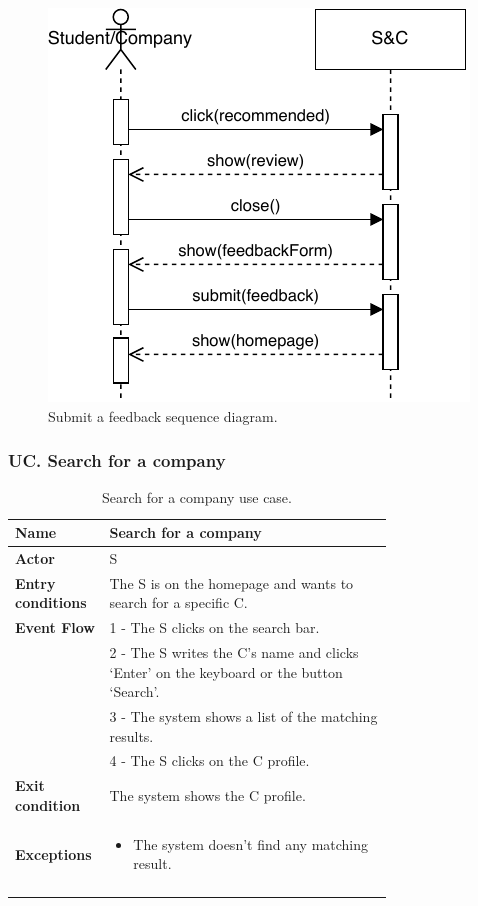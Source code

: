 \begin{figure}[H]
    \begin{center}
        \includegraphics[width=0.7\linewidth]{Images/SequenceDiagram/SubmitFeedbackSD.pdf}
        \caption{Submit a feedback sequence diagram.}
        \label{fig:submit_a_feedback_seqdiag}%
    \end{center}
\end{figure}


\subsubsection*{UC\cuc . Search for a company}
\begin{center}
    \begin{longtable}{|l|p{0.75\linewidth}|}
        \hline
        \textbf{Name}               & Search for a company\\
        \hline
        \textbf{Actor}              & S\\
        \hline
        \textbf{Entry conditions}   & The S is on the homepage and wants to search for a specific C.\\
        \hline
        \textbf{Event Flow}         & 1 - The S clicks on the search bar. \\
        & 2 - The S writes the C’s name and clicks ‘Enter’ on the keyboard or the button ‘Search’. \\
        & 3 - The system shows a list of the matching results. \\
        & 4 - The S clicks on the C profile. \\
        \hline
        \textbf{Exit condition}   & The system shows the C profile. \\       
        \hline
        \textbf{Exceptions}       & \begin{itemize}
            \item The system doesn't find any matching result.
        \end{itemize}\\
        \hline
        \caption{Search for a company use case.}
        \label{tab: search_for_a_company_use_case}
    \end{longtable}
\end{center}


